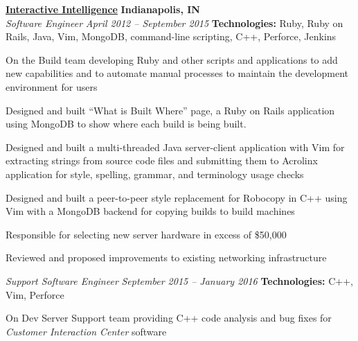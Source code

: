 %
    \headerrow
        {\textbf{\href{https://www.genesys.com/inin}{Interactive Intelligence}}}
        {\textbf{Indianapolis, IN}}
    \\
    \headerrow
        {\emph{Software Engineer}}
        {\emph{April 2012 -- September 2015}}
    \hspace{3.0em}
    \textbf{Technologies:} Ruby, Ruby on Rails, Java, Vim, MongoDB, command-line scripting, C++, Perforce, Jenkins
    \vspace{0.3em}

    \begin{itemize*}
        \item On the Build team developing Ruby and other scripts and applications to add new capabilities and to
                automate manual processes to maintain the development environment for users
        \item Designed and built ``What is Built Where'' page, a Ruby on Rails application using MongoDB to show where
                each build is being built.
         \item Designed and built a multi-threaded Java server-client application with Vim for extracting strings from
                source code files and submitting them to Acrolinx application for style, spelling, grammar, and terminology
                usage checks
        \item Designed and built a peer-to-peer style replacement for Robocopy in C++ using Vim with a MongoDB backend
                for copying builds to build machines
        \item Responsible for selecting new server hardware in excess of \$50,000
        \item Reviewed and proposed improvements to existing networking infrastructure
    \end{itemize*}

    \headerrow
        {\emph{Support Software Engineer}}
        {\emph{September 2015 -- January 2016}}
    \hspace{1.0em}
    \textbf{Technologies:} C++, Vim, Perforce
    \begin{itemize*}
        \item On Dev Server Support team providing C++ code analysis and bug fixes for \emph{Customer Interaction Center} software
    \end{itemize*}

